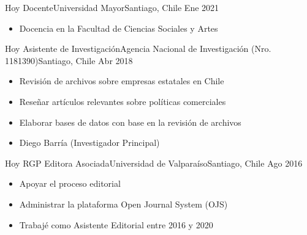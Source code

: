 






\begin{experiences}
  \emptySeparator 
  \experience 
    {Hoy} {Docente}{Universidad Mayor}{Santiago, Chile} {Ene 2021}
    {\begin{itemize}
    \item Docencia en la Facultad de Ciencias Sociales y Artes
    \end{itemize}}
    {}
\end{experiences}
\vspace{-2mm}

\begin{experiences}
  \emptySeparator 
  \experience 
    {Hoy} {Asistente de Investigación}{Agencia Nacional de Investigación (Nro. 1181390)}{Santiago, Chile} {Abr 2018}
    {\begin{itemize}
    \item Revisión de archivos sobre empresas estatales en Chile
    \item Reseñar artículos relevantes sobre políticas comerciales
    \item Elaborar bases de datos con base en la revisión de archivos
    \item Diego Barría {\small (Investigador Principal)}
    \end{itemize}}
    {}
\end{experiences}
\vspace{-2mm}

\begin{experiences}
  \experience
    {Hoy} {RGP Editora Asociada}{Universidad de Valparaíso}{Santiago, Chile} {Ago 2016}
    {\begin{itemize}
    \item Apoyar el proceso editorial
    \item Administrar la plataforma Open Journal System (OJS)
    \item Trabajé como Asistente Editorial entre 2016 y 2020
    \end{itemize}}
    {}
\end{experiences}
\vspace{-2mm}

